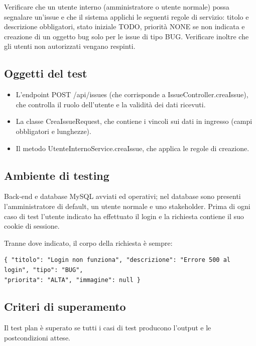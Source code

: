 Verificare che un utente interno (amministratore o utente normale) possa 
segnalare un’issue e che il sistema applichi le seguenti regole di servizio: 
titolo e descrizione obbligatori, stato iniziale TODO, priorità NONE se non 
indicata e creazione di un oggetto bug solo per le issue di tipo BUG.  
Verificare inoltre che gli utenti non autorizzati vengano respinti. 

\subsection{Oggetti del test} 
\begin{itemize}
  \item L'endpoint POST /api/issues (che corrisponde a IssueController.creaIssue), 
che controlla il ruolo dell'utente e la validità dei dati ricevuti. 
\item La classe CreaIssueRequest, che contiene i vincoli sui dati in ingresso 
(campi obbligatori e lunghezze). 
  \item Il metodo UtenteInternoService.creaIssue, che applica le regole di creazione.
  \end{itemize}

\subsection{Ambiente di testing} 

Back-end e database MySQL avviati ed operativi; nel database sono 
presenti l'amministratore di default, un utente normale e uno stakeholder. Prima di ogni caso di test l'utente indicato ha effettuato il login
 e la richiesta contiene il suo cookie di sessione.  

\noindent Tranne dove indicato, il corpo della richiesta è sempre: 

\begin{minipage}{\linewidth}
\begin{verbatim}
{ "titolo": "Login non funziona", "descrizione": "Errore 500 al login", "tipo": "BUG", 
"priorita": "ALTA", "immagine": null } 
\end{verbatim}
\end{minipage}

\subsection{Criteri di superamento}
Il test plan è superato se tutti i casi di test producono l'output e 
le postcondizioni attese.

